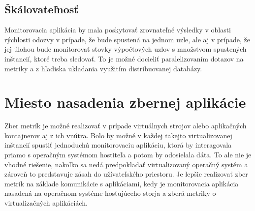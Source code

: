 \documentclass[printed,11pt,twoside,color,cover,table]{fithesis3}
\begin{document}
\subsection{Škálovateľnosť}
Monitorovacia aplikácia by mala poskytovať zrovnateľné výsledky v oblasti rýchlosti odozvy v prípade, že bude spustená na jednom uzle, ale aj v prípade, že jej úlohou bude monitorovať stovky 
výpočtových uzlov s množstvom spustených inštancií, ktoré treba sledovať. To je možné docieliť paralelizovaním dotazov na metriky a z hľadiska ukladania využitím distribuovanej databázy.

\section{Miesto nasadenia zbernej aplikácie}
Zber metrík je možné realizovať v prípade virtuálnych strojov alebo aplikačných kontajnerov aj z ich vnútra. Bolo by možné v každej
takejto virtualizovanej inštancií spustiť jednoduchú monitorovaciu aplikáciu, ktorá by interagovala priamo s operačným systémom hostiteľa a potom by odosielala dáta.
To ale nie je vhodné riešenie, nakoľko sa nedá predpokladať virtualizovaný operačný systém a zároveň to predstavuje zásah do užívateľského
priestoru. Je lepšie realizovať zber metrík na základe komunikácie s aplikáciami, kedy je monitorovacia aplikácia nasadená na operačnom systéme hosťujúceho storja a zberá metriky o virtualizačných aplikáciách.
\end{document}
